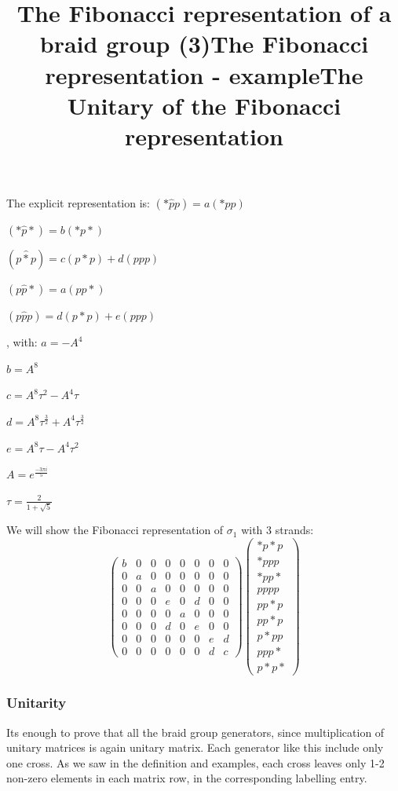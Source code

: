 \documentclass{article}
\begin{document}
\title{The Fibonacci representation of a braid group (3)}
The explicit representation is:
$(*\hat{p}p)=a(*pp)$

$(*\hat{p}*)=b(*p*)$

$(p\hat{*}p)=c(p*p)+d(ppp)$

$(p\hat{p}*)=a(pp*)$

$(p\hat{p}p)=d(p*p)+e(ppp)$

, with:
$ a = -A^{4} $


 $  b = A^{8}  $
 
 $  c = A^{8}\tau^{2} - A^{4}\tau $
  
 $  d = A^{8}\tau^{\frac{3}{2}} + A^{4}\tau^{\frac{3}{2}} $ 
 
 $  e = A^{8}\tau - A^{4}\tau^{2} $ 
 
 $  A = e^{\frac{-3{\pi}i}{5}} $ 
 
 $  \tau = \frac{2}{1 + \sqrt{5}} $


 
\title{The Fibonacci representation - example}
We will show the Fibonacci representation of $\sigma_{1}$ with 3 strands:
\[
\begin{pmatrix} b & 0 & 0 & 0 & 0 & 0 & 0 & 0 \\ 0 & a & 0 & 0 & 0 & 0 & 0 & 0 \\ 0 & 0 & a & 0 & 0 & 0 & 0 & 0 \\ 0 & 0 & 0 & e & 0 & d & 0 & 0 \\ 0 & 0 & 0 & 0 & a & 0 & 0 & 0 \\ 0 & 0 & 0 & d & 0 & e & 0 & 0 \\0 & 0 & 0 & 0 & 0 & 0 & e & d \\0 & 0 & 0 & 0 & 0 & 0 & d & c \end{pmatrix} 
  \begin{pmatrix} *p*p \\ *ppp \\ *pp* \\ pppp \\ pp*p \\ pp*p \\ p*pp \\ ppp* \\ p*p* \end{pmatrix}
\]

\subsubsection{Unitarity}
\title{The Unitary of the Fibonacci representation}
Its enough to prove that all the braid group generators, since multiplication of unitary matrices is again unitary matrix. Each generator like this include only one cross. As we saw in the definition and examples, each cross leaves only 1-2 non-zero elements in each matrix row, in the corresponding labelling entry.
\end{document}
